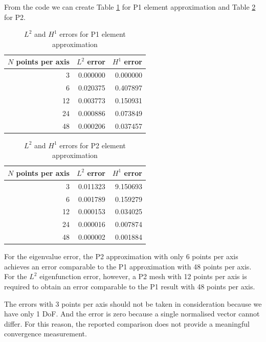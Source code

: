 \documentclass[conference]{IEEEtran}
\begin{document}
From the code we can create Table \ref{tab:L2 and H1 error P1} for P1 element approximation and Table \ref{tab:L2 and H1 error P2} for P2.
\begin{table}[H]
    \centering
    \caption{$L^2$ and $H^1$ errors for P1 element approximation}
    \label{tab:L2 and H1 error P1}
    \begin{tabular}{rrr}
        \toprule
        $N$ points per axis & $L^2$ error & $H^1$ error \\
        \midrule
        3 & 0.000000 & 0.000000 \\
        6 & 0.020375 & 0.407897 \\
        12 & 0.003773 & 0.150931 \\
        24 & 0.000886 & 0.073849 \\
        48 & 0.000206 & 0.037457 \\
        \bottomrule
    \end{tabular}
\end{table}
\begin{table}[H]
    \centering
    \caption{$L^2$ and $H^1$ errors for P2 element approximation}
    \label{tab:L2 and H1 error P2}
    \begin{tabular}{rrr}
        \toprule
        $N$ points per axis & $L^2$ error & $H^1$ error \\
        \midrule
        3 & 0.011323 & 9.150693 \\
        6 & 0.001789 & 0.159279 \\
        12 & 0.000153 & 0.034025 \\
        24 & 0.000016 & 0.007874 \\
        48 & 0.000002 & 0.001884 \\
        \bottomrule
    \end{tabular}
\end{table}

For the eigenvalue error, the P2 approximation with only 6 points per axis achieves an error comparable to the P1 approximation with 48 points per axis. For the $L^2$ eigenfunction error, however, a P2 mesh with 12 points per axis is required to obtain an error comparable to the P1 result with 48 points per axis.

The errors with 3 points per axis should not be taken in consideration because we have only 1 DoF. And the error is zero because a single normalised vector cannot differ. For this reason, the reported comparison does not provide a meaningful convergence measurement.
\end{document}
